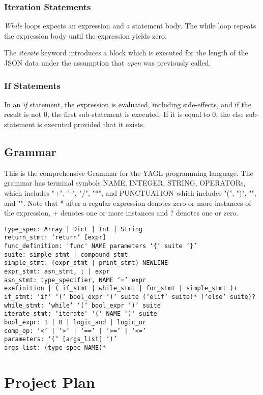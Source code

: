 \documentclass[12pt]{article}
\begin{document}
\subsubsection{Iteration Statements}
\textit{While} loops expects an expression and a statement body. The while loop repeats the expression body until the expression yields zero.

The \textit{iterate} keyword introduces a block which is executed for the length of the JSON data under the assumption that \textit{open} was previously called. 

\subsubsection{If Statements}

In an \textit{if} statement, the expression is evaluated, including side-effects, and if the result is not 0, the first sub-statement is executed. If it is equal to 0, the else sub-statement is executed provided that it exists.

\subsection{Grammar}
This is the comprehensive Grammar for the YAGL programming language. The grammar has terminal symbols NAME, INTEGER, STRING, OPERATORs, which includes "+", "-", "/", "*", and PUNCTUATION which includes "(", ")", "{", and "}". Note that * after a regular expression denotes zero or more instances of the expression, + denotes one or more instances and ? denotes one or zero.

\begin{lstlisting}
type_spec: Array | Dict | Int | String
return_stmt: ‘return’ [expr]
func_definition: 'func' NAME parameters ‘{‘ suite ‘}’
suite: simple_stmt | compound_stmt
simple_stmt: (expr_stmt | print_stmt) NEWLINE
expr_stmt: asn_stmt, ; | expr 
asn_stmt: type_specifier, NAME ‘=’ expr
exefinition | ( if_stmt | while_stmt | for_stmt | simple_stmt )+
if_stmt: ‘if’ ‘(‘ bool_expr ‘)’ suite (‘elif’ suite)* (‘else’ suite)?
while_stmt: ‘while’ ‘(‘ bool_expr ’)’ suite
iterate_stmt: 'iterate' '(' NAME ')' suite
bool_expr: 1 | 0 | logic_and | logic_or 
comp_op: ‘<’ | ‘>’ | ‘==’ | ‘>=’ | ‘<=’
parameters: ‘(‘ [args_list] ‘)’
args_list: (type_spec NAME)*
\end{lstlisting}

\section{Project Plan}
\end{document}
